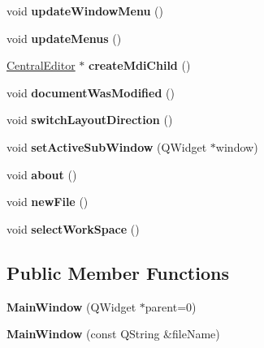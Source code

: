 \begin{DoxyCompactItemize}
\item 
\hypertarget{class_main_window_a42b2cea291f851053098ee1e73834314}{
void {\bfseries updateWindowMenu} ()}
\label{class_main_window_a42b2cea291f851053098ee1e73834314}

\item 
\hypertarget{class_main_window_ae14460f8fd86ad209cbbd57ed8e241ee}{
void {\bfseries updateMenus} ()}
\label{class_main_window_ae14460f8fd86ad209cbbd57ed8e241ee}

\item 
\hypertarget{class_main_window_af27a1c66e0d4bf03f558e931e234ad49}{
\hyperlink{class_central_editor}{CentralEditor} $\ast$ {\bfseries createMdiChild} ()}
\label{class_main_window_af27a1c66e0d4bf03f558e931e234ad49}

\item 
\hypertarget{class_main_window_a0bb26e858900f8c205484410e4d42a8d}{
void {\bfseries documentWasModified} ()}
\label{class_main_window_a0bb26e858900f8c205484410e4d42a8d}

\item 
\hypertarget{class_main_window_af063a0121b573c723b7b714009dca858}{
void {\bfseries switchLayoutDirection} ()}
\label{class_main_window_af063a0121b573c723b7b714009dca858}

\item 
\hypertarget{class_main_window_a05ffe5b25bba4cd89d0aa192f557e1c3}{
void {\bfseries setActiveSubWindow} (QWidget $\ast$window)}
\label{class_main_window_a05ffe5b25bba4cd89d0aa192f557e1c3}

\item 
\hypertarget{class_main_window_a7be6a5d98970ac1a6296c6f9aee1e9bb}{
void {\bfseries about} ()}
\label{class_main_window_a7be6a5d98970ac1a6296c6f9aee1e9bb}

\item 
\hypertarget{class_main_window_a69f73b93cc05c89a9ae1be0161105982}{
void {\bfseries newFile} ()}
\label{class_main_window_a69f73b93cc05c89a9ae1be0161105982}

\item 
\hypertarget{class_main_window_affcca2fccac4a959f03f9c2a62a84b19}{
void {\bfseries selectWorkSpace} ()}
\label{class_main_window_affcca2fccac4a959f03f9c2a62a84b19}

\end{DoxyCompactItemize}
\subsection*{Public Member Functions}
\begin{DoxyCompactItemize}
\item 
\hypertarget{class_main_window_a8b244be8b7b7db1b08de2a2acb9409db}{
{\bfseries MainWindow} (QWidget $\ast$parent=0)}
\label{class_main_window_a8b244be8b7b7db1b08de2a2acb9409db}

\item 
\hypertarget{class_main_window_a9183776f2c6f0a34c6261cbaa1041ff8}{
{\bfseries MainWindow} (const QString \&fileName)}
\label{class_main_window_a9183776f2c6f0a34c6261cbaa1041ff8}

\end{DoxyCompactItemize}
